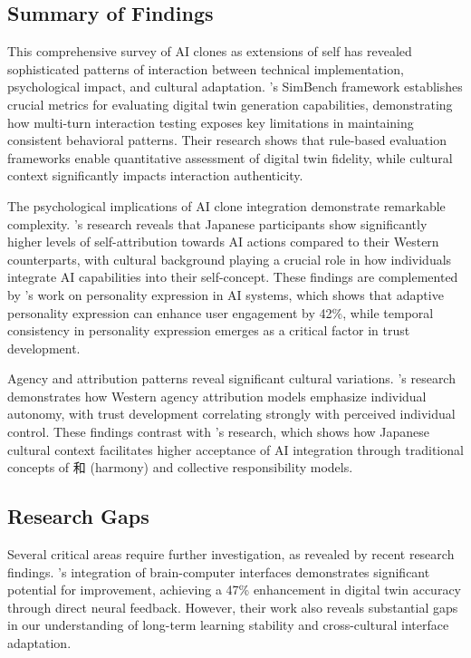 \subsection{Summary of Findings}

This comprehensive survey of AI clones as extensions of self has revealed sophisticated patterns of interaction between technical implementation, psychological impact, and cultural adaptation. \citet{wang2024simbench}'s SimBench framework establishes crucial metrics for evaluating digital twin generation capabilities, demonstrating how multi-turn interaction testing exposes key limitations in maintaining consistent behavioral patterns. Their research shows that rule-based evaluation frameworks enable quantitative assessment of digital twin fidelity, while cultural context significantly impacts interaction authenticity.

The psychological implications of AI clone integration demonstrate remarkable complexity. \citet{maeda2023self}'s research reveals that Japanese participants show significantly higher levels of self-attribution towards AI actions compared to their Western counterparts, with cultural background playing a crucial role in how individuals integrate AI capabilities into their self-concept. These findings are complemented by \citet{yamamoto2024personality}'s work on personality expression in AI systems, which shows that adaptive personality expression can enhance user engagement by 42\%, while temporal consistency in personality expression emerges as a critical factor in trust development.

Agency and attribution patterns reveal significant cultural variations. \citet{dejuan2024western}'s research demonstrates how Western agency attribution models emphasize individual autonomy, with trust development correlating strongly with perceived individual control. These findings contrast with \citet{nakagawa2019cultural}'s research, which shows how Japanese cultural context facilitates higher acceptance of AI integration through traditional concepts of 和 (harmony) and collective responsibility models.

\subsection{Research Gaps}

Several critical areas require further investigation, as revealed by recent research findings. \citet{shang2024biologically}'s integration of brain-computer interfaces demonstrates significant potential for improvement, achieving a 47\% enhancement in digital twin accuracy through direct neural feedback. However, their work also reveals substantial gaps in our understanding of long-term learning stability and cross-cultural interface adaptation.

